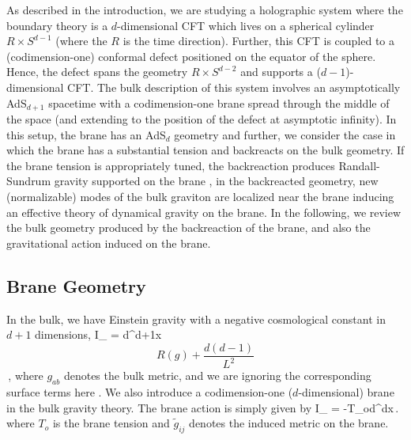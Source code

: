 %

As described in the introduction, we are studying a holographic system where the boundary theory is a $d$-dimensional CFT which lives on a spherical cylinder $R\times S^{d-1}$ (where the $R$ is the time direction). Further, this CFT is coupled to a (codimension-one) conformal defect positioned on the equator of the sphere. Hence, the defect spans the geometry $R\times S^{d-2}$ and supports a ($d-1$)-dimensional CFT. The bulk description of this system involves an asymptotically AdS$_{d+1}$ spacetime with a codimension-one brane spread through the middle of the space (and extending to the position of the defect at asymptotic infinity). In this setup, the brane has an AdS$_d$ geometry and further, we consider the case in which the brane has a substantial tension and backreacts on the bulk geometry. If the brane tension is appropriately tuned, the backreaction produces Randall-Sundrum gravity  supported on the brane \cite{Randall:1999vf,Randall:1999ee}, \ie in the backreacted geometry, new (normalizable) modes of the bulk graviton are localized near the brane inducing an effective theory of dynamical gravity on the brane. In the following, we review the bulk geometry produced by the backreaction of the brane, and also the gravitational action induced on the brane.

\subsection{Brane Geometry}\label{BranGeo}

In the bulk, we have Einstein gravity with a negative cosmological constant in $d+1$ dimensions, \ie
\beq
I_ = \int d^{d+1}x
\[{R}(g) + \frac{d(d-1)}{L^2} \] \,,
\label{act2}
\eeq
where $g_{ab}$ denotes the bulk metric, and we are ignoring the corresponding surface terms here \cite{PhysRevLett.28.1082,Gibbons:1976ue,Emparan:1999pm}.
We also introduce a codimension-one (\ie $d$-dimensional) brane in the bulk gravity theory. The brane action is simply given by
\beq\label{braneaction}
I_ = -T_o\int d^dx\,.
\eeq
where $T_o$ is the brane tension and $\tilde g_{ij}$ denotes the induced metric on the brane.

